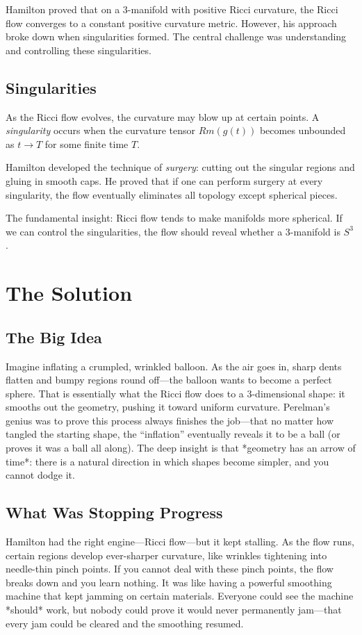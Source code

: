 Hamilton proved that on a 3-manifold with positive Ricci curvature, the Ricci flow converges to a constant positive curvature metric. However, his approach broke down when singularities formed. The central challenge was understanding and controlling these singularities.

\subsection{Singularities}

As the Ricci flow evolves, the curvature may blow up at certain points. A \emph{singularity} occurs when the curvature tensor $Rm(g(t))$ becomes unbounded as $t \to T$ for some finite time $T$.

Hamilton developed the technique of \emph{surgery}: cutting out the singular regions and gluing in smooth caps. He proved that if one can perform surgery at every singularity, the flow eventually eliminates all topology except spherical pieces.

\begin{highlightbox}
The fundamental insight: Ricci flow tends to make manifolds more spherical. If we can control the singularities, the flow should reveal whether a 3-manifold is $S^3$.
\end{highlightbox}

\section{The Solution}

\subsection{The Big Idea}
Imagine inflating a crumpled, wrinkled balloon. As the air goes in, sharp dents flatten and bumpy regions round off---the balloon wants to become a perfect sphere. That is essentially what the Ricci flow does to a 3-dimensional shape: it smooths out the geometry, pushing it toward uniform curvature. Perelman's genius was to prove this process always finishes the job---that no matter how tangled the starting shape, the ``inflation'' eventually reveals it to be a ball (or proves it was a ball all along). The deep insight is that *geometry has an arrow of time*: there is a natural direction in which shapes become simpler, and you cannot dodge it.

\subsection{What Was Stopping Progress}
Hamilton had the right engine---Ricci flow---but it kept stalling. As the flow runs, certain regions develop ever-sharper curvature, like wrinkles tightening into needle-thin pinch points. If you cannot deal with these pinch points, the flow breaks down and you learn nothing. It was like having a powerful smoothing machine that kept jamming on certain materials. Everyone could see the machine *should* work, but nobody could prove it would never permanently jam---that every jam could be cleared and the smoothing resumed.

